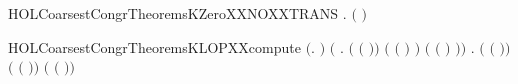 \newcommand{\HOLCoarsestCongrTheoremsINFINITEXXEXISTSXXLEMMA}{\UseVerbatim{HOLCoarsestCongrTheoremsINFINITEXXEXISTSXXLEMMA}}
\begin{SaveVerbatim}{HOLCoarsestCongrTheoremsKZeroXXNOXXTRANS}
\HOLTokenTurnstile{} \HOLSymConst{\HOLTokenForall{}}  . \HOLSymConst{\HOLTokenNeg{}}\ensuremath{(}   \HOLTokenTransBegin{}\HOLTokenTransEnd {}\ensuremath{)}
\end{SaveVerbatim}
\newcommand{\HOLCoarsestCongrTheoremsKZeroXXNOXXTRANS}{\UseVerbatim{HOLCoarsestCongrTheoremsKZeroXXNOXXTRANS}}
\begin{SaveVerbatim}{HOLCoarsestCongrTheoremsKLOPXXcompute}
\HOLTokenTurnstile{} \ensuremath{(}\HOLSymConst{\HOLTokenForall{}}.    \HOLSymConst{\ensuremath{=}} \ensuremath{)} \HOLSymConst{\HOLTokenConj{}}
   \ensuremath{(}\HOLSymConst{\HOLTokenForall{}} .
          \ensuremath{(} \ensuremath{(} \ensuremath{)}\ensuremath{)} \HOLSymConst{\ensuremath{=}}
          \ensuremath{(} \ensuremath{(} \ensuremath{)} \HOLSymConst{\ensuremath{-}} \ensuremath{)} \HOLSymConst{\ensuremath{+}}
         \HOLSymConst{\ensuremath{\ldotp}}  \ensuremath{(} \ensuremath{(} \ensuremath{)} \HOLSymConst{\ensuremath{-}} \ensuremath{)}\ensuremath{)} \HOLSymConst{\HOLTokenConj{}}
   \HOLSymConst{\HOLTokenForall{}} .
         \ensuremath{(} \ensuremath{(} \ensuremath{)}\ensuremath{)} \HOLSymConst{\ensuremath{=}}
         \ensuremath{(} \ensuremath{(} \ensuremath{)}\ensuremath{)} \HOLSymConst{\ensuremath{+}}
        \HOLSymConst{\ensuremath{\ldotp}}  \ensuremath{(} \ensuremath{(} \ensuremath{)}\ensuremath{)}
\end{SaveVerbatim}
\newcommand{\HOLCoarsestCongrTheoremsKLOPXXcompute}{\UseVerbatim{HOLCoarsestCongrTheoremsKLOPXXcompute}}
